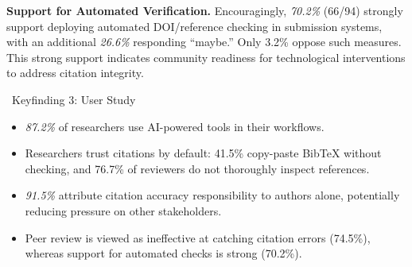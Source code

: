\noindent
\textbf{Support for Automated Verification.}
Encouragingly, \textit{70.2\%} (66/94) strongly support deploying automated DOI/reference checking in submission systems, with an additional \textit{26.6\%} responding ``maybe.''
Only 3.2\% oppose such measures.
This strong support indicates community readiness for technological interventions to address citation integrity.

\begin{keyfindingsSidebar}{\faLightbulb\ Keyfinding 3: User Study}
\begin{itemize}
    \setlength{\itemsep}{-0pt}
    \setlength{\topsep}{0pt}
    \setlength{\partopsep}{0pt}
    \setlength{\parsep}{-0pt}
    \item \textit{87.2\%} of researchers use AI-powered tools in their workflows.
    \item Researchers trust citations by default: 41.5\% copy-paste BibTeX without checking, and 76.7\% of reviewers do not thoroughly inspect references.
    \item \textit{91.5\%} attribute citation accuracy responsibility to authors alone, potentially reducing pressure on other stakeholders.
    \item Peer review is viewed as ineffective at catching citation errors (74.5\%), whereas support for automated checks is strong (70.2\%).
\end{itemize}
\end{keyfindingsSidebar}






